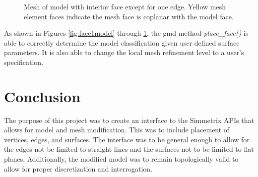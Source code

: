 \documentclass[a4paper, 12pt]{article}
\begin{document}
\begin{figure}[H]
  \centering
  \caption{Mesh of model with interior face except for one edge. 
        Yellow mesh element faces indicate the mesh face is coplanar with the
        model face.}
  \label{fig:face3mesh}
\end{figure}

As shown in Figures \ref{fig:face1model} through \ref{fig:face3mesh}, 
the gmd method \emph{place\_face()} is able to correctly determine 
the model classification given user defined surface parameters. It is also 
able to change the local mesh refinement level to a user's specification. 

\section{Conclusion} \label{sec:conclusion}
The purpose of this project was to create an interface to the 
Simmetrix APIs that allows for model and mesh modification. This
was to include placement of vertices, edges, and surfaces. The 
interface was to be general enough to allow for the edges not be limited
to straight lines and the surfaces not to be limited to flat planes. 
Additionally, the modified model was to remain topologically valid
to allow for proper discretization and interrogation. 
\end{document}
